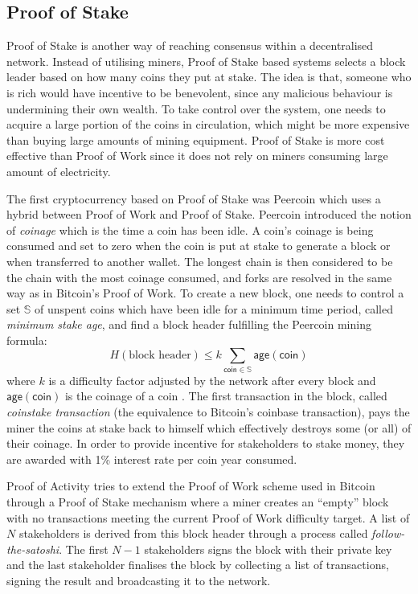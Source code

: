 \documentclass{style/kththesis}
\begin{document}
\subsection{Proof of Stake}
Proof of Stake is another  way of reaching consensus within a decentralised network. Instead of utilising miners, Proof of Stake based systems selects a block leader based on how many coins they put at stake. The idea is that, someone who is rich would have incentive to be benevolent, since any malicious behaviour is undermining their own wealth. To take control over the system, one needs to acquire a large portion of the coins in circulation, which might be more expensive than buying large amounts of mining equipment. Proof of Stake is more cost effective than Proof of Work since it does not rely on miners consuming large amount of electricity.

The first cryptocurrency based on Proof of Stake was Peercoin \cite{King12} which uses a hybrid between Proof of Work and Proof of Stake. Peercoin introduced the notion of \emph{coinage} which is the time a coin has been idle. A coin's coinage is being consumed and set to zero when the coin is put at stake to generate a block or when transferred to another wallet. The longest chain is then considered to be the chain with the most coinage consumed, and forks are resolved in the same way as in Bitcoin's Proof of Work. To create a new block, one needs to control a set $\mathbb{S}$ of unspent coins which have been idle for a minimum time period, called \emph{minimum stake age}, and find a block header fulfilling the Peercoin mining formula:
\begin{equation}
H(\text{block header}) \le k \sum_{\mathsf{coin} \in \mathbb{S}}{\mathsf{age}(\mathsf{coin})}    
\end{equation}
where $k$ is a difficulty factor adjusted by the network after every block and $\mathsf{age}(\mathsf{coin})$ is the coinage of a coin \cite{Davarpanah15}. The first transaction in the block, called \emph{coinstake transaction} (the equivalence to Bitcoin's coinbase transaction), pays the miner the coins at stake back to himself which effectively destroys some (or all) of their coinage. In order to provide incentive for stakeholders to stake money, they are awarded with 1\% interest rate per coin year consumed.

Proof of Activity \cite{Bentov14} tries to extend the Proof of Work scheme used in Bitcoin through a Proof of Stake mechanism where a miner creates an ``empty'' block with no transactions meeting the current Proof of Work difficulty target. A list of $N$ stakeholders is derived from this block header through a process called \emph{follow-the-satoshi}. The first $N - 1$ stakeholders signs the block with their private key and the last stakeholder finalises the block by collecting a list of transactions, signing the result and broadcasting it to the network.
\end{document}
